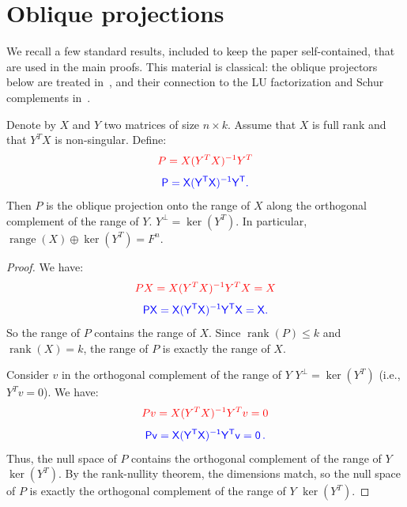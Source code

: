 \documentclass[10pt,twoside]{siamart1116}
\DeclareMathOperator{\rk}{rank}
\DeclareMathOperator{\range}{range} %
\newcommand{\by}{\times}
\numberwithin{theorem}{section}
\providecommand{\DIFadd}[1]{{\protect\color{blue} \sf #1}} %
\providecommand{\DIFdel}[1]{{\protect\color{red} \scriptsize #1}} %
\providecommand{\DIFaddbegin}{} %
\providecommand{\DIFaddend}{} %
\providecommand{\DIFdelbegin}{} %
\providecommand{\DIFdelend}{} %
\begin{document}
\section{\DIFadd{Oblique projections}}\label{sec:appendix}

\DIFadd{We recall a few standard results, included to keep the paper self-contained, that are used in the main proofs. This material is classical: the oblique projectors below are treated in~\cite{Stewart_2011,Kayalar_1989}, and their connection to the LU factorization and Schur complements in~\cite{Cottle_1974,Ouellette_1981,Zhang_2006,Householder_2013}.
}

\begin{lemma}\DIFaddend \label{lem:oblique_projection}
  Denote by $X$ and $Y$ two matrices of size $n \by k$. Assume that $X$ is full rank and that $Y^T X$ is non-singular. Define:
  \DIFdelbegin \[ \DIFdel{P = X }{\DIFdel{(Y^T X)}}\DIFdel{^{-1} Y^T }\]%
\DIFdelend \DIFaddbegin \[ \DIFadd{P = X }{\DIFadd{(Y^T X)}}\DIFadd{^{-1} Y^T. }\]\DIFaddend 
  Then $P$ is the oblique projection onto the range of $X$ along \DIFdelbegin \DIFdel{the orthogonal complement of the range of $Y$. }\DIFdelend \DIFaddbegin \DIFadd{$Y^\perp = \ker(Y^T)$. In particular, $\range(X) \oplus \ker(Y^T) = F^n$.
}\DIFaddend \end{lemma}

\begin{proof}
  We have:
  \DIFdelbegin \[ \DIFdel{P X = X }{\DIFdel{(Y^T X)}}\DIFdel{^{-1} Y^T X = X }\]%
\DIFdelend \DIFaddbegin \[ \DIFadd{P X = X }{\DIFadd{(Y^T X)}}\DIFadd{^{-1} Y^T X = X. }\]\DIFaddend 
  So the range of $P$ contains the range of $X$. Since $\rk(P) \le k$ and $\rk(X)=k$, the range of $P$ is exactly the range of $X$.

  Consider $v$ in \DIFdelbegin \DIFdel{the orthogonal complement of the range of $Y$ }\DIFdelend \DIFaddbegin \DIFadd{$Y^\perp = \ker(Y^T)$ }\DIFaddend (i.e., $Y^T v = 0$). We have:
  \DIFdelbegin \[ \DIFdel{P v = X }{\DIFdel{(Y^T X)}}\DIFdel{^{-1} Y^T v = 0 }\]%
\DIFdelend \DIFaddbegin \[ \DIFadd{P v = X }{\DIFadd{(Y^T X)}}\DIFadd{^{-1} Y^T v = 0 \,. }\]\DIFaddend 
  Thus, the null space of $P$ contains \DIFdelbegin \DIFdel{the orthogonal complement of the range of $Y$}\DIFdelend \DIFaddbegin \DIFadd{$\ker(Y^T)$}\DIFaddend . By the rank-nullity theorem, the dimensions match, so the null space of $P$ is exactly \DIFdelbegin \DIFdel{the orthogonal complement of the range of $Y$}\DIFdelend \DIFaddbegin \DIFadd{$\ker(Y^T)$}\DIFaddend .
\end{proof}
\end{document}
